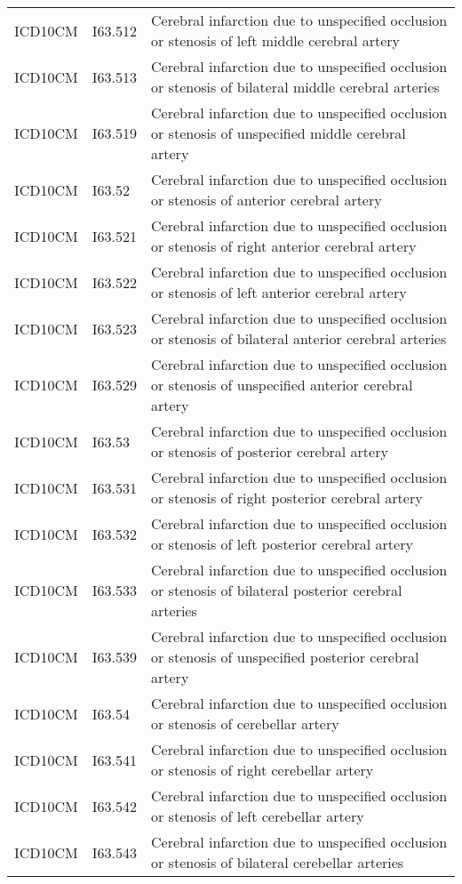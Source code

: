 \begin{longtable}{p{}p{}p{}}
  ICD10CM & I63.512 & Cerebral infarction due to unspecified occlusion or stenosis of left middle cerebral artery \\ 
  ICD10CM & I63.513 & Cerebral infarction due to unspecified occlusion or stenosis of bilateral middle cerebral arteries \\ 
  ICD10CM & I63.519 & Cerebral infarction due to unspecified occlusion or stenosis of unspecified middle cerebral artery \\ 
  ICD10CM & I63.52 & Cerebral infarction due to unspecified occlusion or stenosis of anterior cerebral artery \\ 
  ICD10CM & I63.521 & Cerebral infarction due to unspecified occlusion or stenosis of right anterior cerebral artery \\ 
  ICD10CM & I63.522 & Cerebral infarction due to unspecified occlusion or stenosis of left anterior cerebral artery \\ 
  ICD10CM & I63.523 & Cerebral infarction due to unspecified occlusion or stenosis of bilateral anterior cerebral arteries \\ 
  ICD10CM & I63.529 & Cerebral infarction due to unspecified occlusion or stenosis of unspecified anterior cerebral artery \\ 
  ICD10CM & I63.53 & Cerebral infarction due to unspecified occlusion or stenosis of posterior cerebral artery \\ 
  ICD10CM & I63.531 & Cerebral infarction due to unspecified occlusion or stenosis of right posterior cerebral artery \\ 
  ICD10CM & I63.532 & Cerebral infarction due to unspecified occlusion or stenosis of left posterior cerebral artery \\ 
  ICD10CM & I63.533 & Cerebral infarction due to unspecified occlusion or stenosis of bilateral posterior cerebral arteries \\ 
  ICD10CM & I63.539 & Cerebral infarction due to unspecified occlusion or stenosis of unspecified posterior cerebral artery \\ 
  ICD10CM & I63.54 & Cerebral infarction due to unspecified occlusion or stenosis of cerebellar artery \\ 
  ICD10CM & I63.541 & Cerebral infarction due to unspecified occlusion or stenosis of right cerebellar artery \\ 
  ICD10CM & I63.542 & Cerebral infarction due to unspecified occlusion or stenosis of left cerebellar artery \\ 
  ICD10CM & I63.543 & Cerebral infarction due to unspecified occlusion or stenosis of bilateral cerebellar arteries \\ 

\end{longtable}
